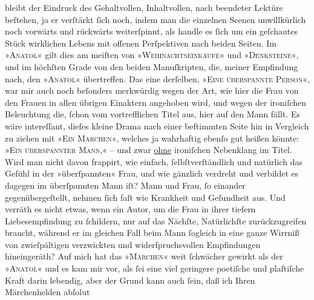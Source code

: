                bleibt der Eindruck des Gehaltvollen, Inhaltvollen, nach beendeter Lektüre beſtehen,
               ja er verſtärkt ſich noch, indem man die einzelnen Scenen unwillkürlich noch vorwärts
               und rückwärts weiterſpinnt, als handle es ſich um ein geſchautes Stück wirklichen
               Lebens mit offenen Perſpektiven nach beiden Seiten. Im »\textsc{Anatol}« gilt dies am meiſten von »\textsc{Weihnachtseinkäufe}« und »\textsc{Denksteine}«, und im höchſten Grade von den beiden Manuſkripten, die, meiner Empfindung
               nach, den »\textsc{Anatol}« übertreffen. Das eine derſelben, »\textsc{Eine überspannte Person}«, war mir auch noch beſonders merkwürdig wegen der Art, wie hier die Frau von
               den Frauen {\pb}in allen übrigen Einaktern
               angehoben wird, und wegen der ironiſchen Beleuchtung die, ſchon vom vortrefflichen
               Titel aus, hier auf den Mann fällt. Es wäre intereſſant, dieſes kleine Drama nach
               einer beſtimmten Seite hin in Vergleich zu ziehen mit »\textsc{Ein Märchen}«, welches ja wahrhaftig ebenſo gut heißen könnte: »\textsc{Ein
                  überspannter Mann},« – und zwar \uline{ohne}
               ironiſchen Nebenklang im Titel. Wird man nicht davon frappirt, wie einfach,
               ſelbſtverſtändlich und natürlich das Gefühl in der »überſpannten« Frau, und wie
               gänzlich verdreht und verbildet es dagegen im überſpannten Mann iſt? Mann und Frau,
               ſo einander gegenübergeſtellt, nehmen ſich faſt wie Krankheit und Geſundheit aus. Und
               verräth es nicht etwas, wenn ein Autor, um die Frau
               in ihrer tiefern Liebesempfindung zu ſchildern, nur auf das Nächſte, Natürlichſte
               zurückzugreifen braucht, während er im gleichen Fall beim Mann ſogleich in {\pb}eine ganze Wirrniß von zwieſpältigen
               verzwickten und widerſpruchsvollen Empfindungen hineingeräth? Auf mich hat das »\textsc{Märchen}« weit ſchwächer gewirkt als der »\textsc{Anatol}« und es kam mir vor, als ſei eine viel geringere poetiſche und plaſtiſche Kraft
               darin lebendig, aber der Grund kann auch ſein, daß ich Ihren Märchenhelden abſolut
